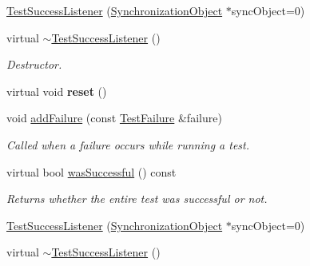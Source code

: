 \begin{DoxyCompactItemize}
\item 
\hyperlink{class_test_success_listener_a352149e92d18a2f3e122e425d7af3a91}{Test\+Success\+Listener} (\hyperlink{class_synchronized_object_1_1_synchronization_object}{Synchronization\+Object} $\ast$sync\+Object=0)
\item 
\hypertarget{class_test_success_listener_aa58cdaae8e9b81afbac797a88941098e}{virtual \hyperlink{class_test_success_listener_aa58cdaae8e9b81afbac797a88941098e}{$\sim$\+Test\+Success\+Listener} ()}\label{class_test_success_listener_aa58cdaae8e9b81afbac797a88941098e}

\begin{DoxyCompactList}\small\item\em Destructor. \end{DoxyCompactList}\item 
\hypertarget{class_test_success_listener_aa2d7201a30f8b59dacf40436f8a67ffe}{virtual void {\bfseries reset} ()}\label{class_test_success_listener_aa2d7201a30f8b59dacf40436f8a67ffe}

\item 
void \hyperlink{class_test_success_listener_a912bb5ea408b2be5b39cfb45e1bb402f}{add\+Failure} (const \hyperlink{class_test_failure}{Test\+Failure} \&failure)
\begin{DoxyCompactList}\small\item\em Called when a failure occurs while running a test. \end{DoxyCompactList}\item 
\hypertarget{class_test_success_listener_ab0166899a0aaad8e759f37a27b517aa1}{virtual bool \hyperlink{class_test_success_listener_ab0166899a0aaad8e759f37a27b517aa1}{was\+Successful} () const }\label{class_test_success_listener_ab0166899a0aaad8e759f37a27b517aa1}

\begin{DoxyCompactList}\small\item\em Returns whether the entire test was successful or not. \end{DoxyCompactList}\item 
\hyperlink{class_test_success_listener_a88e82abf23a0563e345e0883d132f267}{Test\+Success\+Listener} (\hyperlink{class_synchronized_object_1_1_synchronization_object}{Synchronization\+Object} $\ast$sync\+Object=0)
\item 
\hypertarget{class_test_success_listener_a0d51db5b1bfc10a479563244d6dcd98c}{virtual \hyperlink{class_test_success_listener_a0d51db5b1bfc10a479563244d6dcd98c}{$\sim$\+Test\+Success\+Listener} ()}\label{class_test_success_listener_a0d51db5b1bfc10a479563244d6dcd98c}


\end{DoxyCompactItemize}
